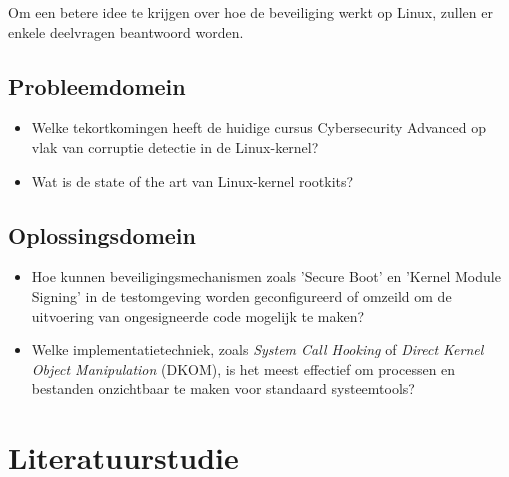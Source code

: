 Om een betere idee te krijgen over hoe de beveiliging werkt op Linux, zullen er enkele deelvragen beantwoord worden.
\subsection{Probleemdomein}
    \begin{itemize}
        \item Welke tekortkomingen heeft de huidige cursus Cybersecurity Advanced op vlak van corruptie detectie in de Linux-kernel?
        \item Wat is de state of the art van Linux-kernel rootkits?
    \end{itemize}
    
\subsection{Oplossingsdomein}
\begin{itemize}
    \itemHoe Op welke wijze kan de ontwikkelde Loadable Kernel Module (LKM) succesvol in het kernelgeheugen worden geladen, en welke technieken zijn nodig om persistentie te garanderen na een reboot?
    \item Hoe kunnen beveiligingsmechanismen zoals 'Secure Boot' en 'Kernel Module Signing' in de testomgeving worden geconfigureerd of omzeild om de uitvoering van ongesigneerde code mogelijk te maken?
    \item Welke implementatietechniek, zoals \textit{System Call Hooking} of \textit{Direct Kernel Object Manipulation} (DKOM), is het meest effectief om processen en bestanden onzichtbaar te maken voor standaard systeemtools?
\end{itemize}



\section{Literatuurstudie}%
\label{sec:literatuurstudie}
